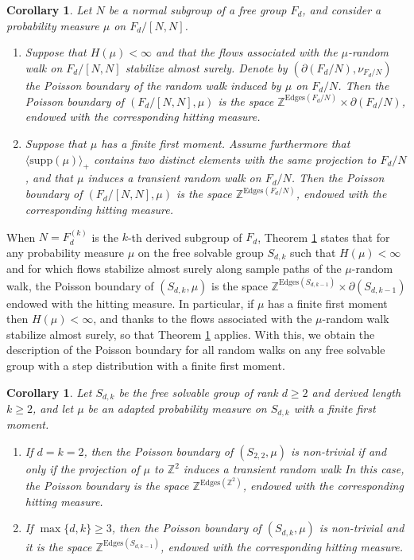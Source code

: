 \documentclass[reqno,oneside,11pt]{amsart}
\newcommand{\Z}{\mathbb{Z}}
\newcommand{\supp}[1]{\mathrm{supp}(#1)}
\theoremstyle{plain}
\newtheorem{cor}[thm]{Corollary}
\theoremstyle{definition}
\begin{document}
 \begin{cor}\label{cor: general description for general Magnus embedding}
 	Let $N$ be a normal subgroup of a free group $F_d$, and consider a probability measure $\mu$ on $F_d/[N,N]$. 
 	\begin{enumerate}
 		\item Suppose that $H(\mu)<\infty$ and that the flows associated with the $\mu$-random walk on $F_d/[N,N]$ stabilize almost surely. Denote by $(\partial (F_d/N),\nu_{F_d/N})$ the Poisson boundary of the random walk induced by $\mu$ on $F_d/N$. Then the Poisson boundary of $(F_d/[N,N],\mu)$ is the space $\Z^{\mathrm{Edges}(F_d/N)}\times \partial (F_d/N)$, endowed with the corresponding hitting measure. 
 		
 		\item Suppose that $\mu$ has a finite first moment. Assume furthermore that $\langle \supp{\mu}\rangle_{+}$ contains two distinct elements with the same projection to $F_d/N$, and that $\mu$ induces a transient random walk on $F_d/N$. Then the Poisson boundary of $(F_d/[N,N],\mu)$ is the space $\Z^{\mathrm{Edges}(F_d/N)}$, endowed with the corresponding hitting measure.
 	\end{enumerate}
 	

 \end{cor}
When $N=F^{(k)}_d$ is the $k$-th derived subgroup of $F_d$, Theorem \ref{cor: general description for general Magnus embedding} states that for any probability measure $\mu$ on the free solvable group $S_{d,k}$ such that $H(\mu)<\infty$ and for which flows stabilize almost surely along sample paths of the $\mu$-random walk, the Poisson boundary of $(S_{d,k},\mu)$ is the space $\Z^{\mathrm{Edges}(S_{d,k-1})}\times \partial(S_{d,k-1})$ endowed with the hitting measure. In particular, if $\mu$ has a finite first moment then $H(\mu)<\infty$, and thanks to \cite[Lemma 1.2]{Erschler2011} the flows associated with the $\mu$-random walk stabilize almost surely, so that Theorem \ref{cor: general description for general Magnus embedding} applies. With this, we obtain the description of the Poisson boundary for all random walks on any free solvable group with a step distribution with a finite first moment.
 \begin{cor}\label{cor: description for free solvable group}
 	Let $S_{d,k}$ be the free solvable group of rank $d\ge 2$ and derived length $k\ge 2$, and let $\mu$ be an adapted probability measure on $S_{d,k}$ with a finite first moment.
 	\begin{enumerate}
 		
 		\item  If $d=k=2$, then the Poisson boundary of $(S_{2,2},\mu)$ is non-trivial if and only if the projection of $\mu$ to $\Z^2$ induces a transient random walk In this case, the Poisson boundary is the space $\Z^{\mathrm{Edges}(\Z^2)}$, endowed with the corresponding hitting measure.
 		\item  If $\max\{d,k\}\ge 3$, then the Poisson boundary of $(S_{d,k},\mu)$ is non-trivial and it is the space $\Z^{\mathrm{Edges}(S_{d,k-1})}$, endowed with the corresponding hitting measure.
 	\end{enumerate}
 \end{cor}
\end{document}
